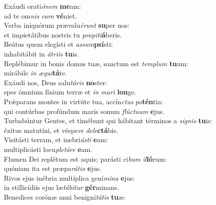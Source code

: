 \evenverse Exáudi orati\textit{ó}\textit{nem} \textbf{me}am:~\*\\
\evenverse ad te om\textit{nis} \textit{ca}\textit{ro} \textbf{vé}niet.\\
\oddverse Verba iniquórum prævalu\textit{é}\textit{runt} \textbf{su}per nos:~\*\\
\oddverse et impietátibus nostris tu \textit{pro}\textit{pi}\textit{ti}\textbf{á}beris.\\
\evenverse Beátus quem elegísti et \textit{as}\textit{sum}\textbf{psí}sti:~\*\\
\evenverse inhabitábit in \textit{á}\textit{tri}\textit{is} \textbf{tu}is.\\
\oddverse Replébimur in bonis domus tuæ, sanctum est \textit{tem}\textit{plum} \textbf{tu}um:~\*\\
\oddverse mirábile \textit{in} \textit{æ}\textit{qui}\textbf{tá}te.\\
\evenverse Exáudi nos, Deus salu\textit{tá}\textit{ris} \textbf{no}ster:~\*\\
\evenverse spes ómnium fínium terræ et \textit{in} \textit{ma}\textit{ri} \textbf{lon}ge.\\
\oddverse Prǽparans montes in virtúte tua, accín\textit{ctus} \textit{po}\textbf{tén}tia:~\*\\
\oddverse qui contúrbas profúndum maris sonum \textit{flú}\textit{ctu}\textit{um} \textbf{e}jus.\\
\evenverse Turbabúntur Gentes, et timébunt qui hábitant términos a \textit{si}\textit{gnis} \textbf{tu}is:~\*\\
\evenverse éxitus matutíni, et véspe\textit{re} \textit{de}\textit{le}\textbf{ctá}bis.\\
\oddverse Visitásti terram, et inebri\textit{á}\textit{sti} \textbf{e}am:~\*\\
\oddverse multiplicásti locu\textit{ple}\textit{tá}\textit{re} \textbf{e}am.\\
\evenverse Flumen Dei replétum est aquis; parásti ci\textit{bum} \textit{il}\textbf{ló}rum:~\*\\
\evenverse quóniam ita est præpa\textit{rá}\textit{ti}\textit{o} \textbf{e}jus.\\
\oddverse Rivos ejus inébria multíplica gení\textit{mi}\textit{na} \textbf{e}jus:~\*\\
\oddverse in stillicídiis ejus læ\textit{tá}\textit{bi}\textit{tur} \textbf{gér}minans.\\
\evenverse Benedíces corónæ anni benigni\textit{tá}\textit{tis} \textbf{tu}æ:~\*\\
